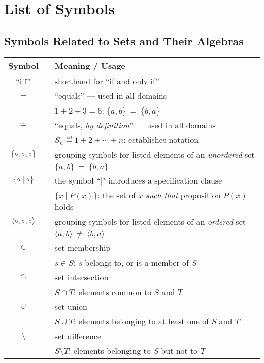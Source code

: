 
\chapter*{List of Symbols}

\section*{Symbols Related to Sets and Their Algebras}

\begin{tabular}{c|cl}
{\bf Symbol} &  & {\bf Meaning} / {\bf Usage} \\ \hline
``iff''
  & & shorthand for ``if and only if'' \\
$=$
  & & ``equals'' --- used in all domains \\
  & & $1 + 2 + 3 = 6$; $\{a,b\} \ = \ \{b,a\}$ \\ \hline
$\eqdef$
  & & ``equals, {\em by definition}'' --- used in all domains \\
  & & $S_n \eqdef 1 + 2 + \cdots + n$: establishes notation \\ \hline
$\{ \circ, \circ, \circ \}$ 
  & & grouping symbols for listed elements of an {\em unordered} set \\
  & & $\{a,b\} \ = \ \{b,a\}$ \\ \hline
$\{ \circ \ | \ \circ \}$
  & & the symbol ``$|$" introduces a specification clause \\
  & & $\{x \ | \ P(x) \}$: the set of $x$ {\em such that} proposition $P(x)$ holds
   \\ \hline
$\langle \circ, \circ, \circ \rangle$
  & & grouping symbols for listed elements of an {\em ordered} set \\
  & & $\langle a,b\rangle \ \neq \ \langle b,a\rangle$ \\ \hline
$\in$
  & & set membership \\
  & & $s \in S$: $s$ belongs to, or is a member of $S$ \\ \hline
$\cap$
  & & set intersection \\
  &  & $S \cap T$: elements common to $S$ and $T$ \\ \hline
$\cup$
  &  & set union \\
  &  & $S \cup T$: elements belonging to at least one of $S$ and $T$ \\ \hline
$\setminus$
  & & set difference \\ 
  & & $S \setminus T$: elements belonging to $S$ but not to $T$ \\

\end{tabular}
